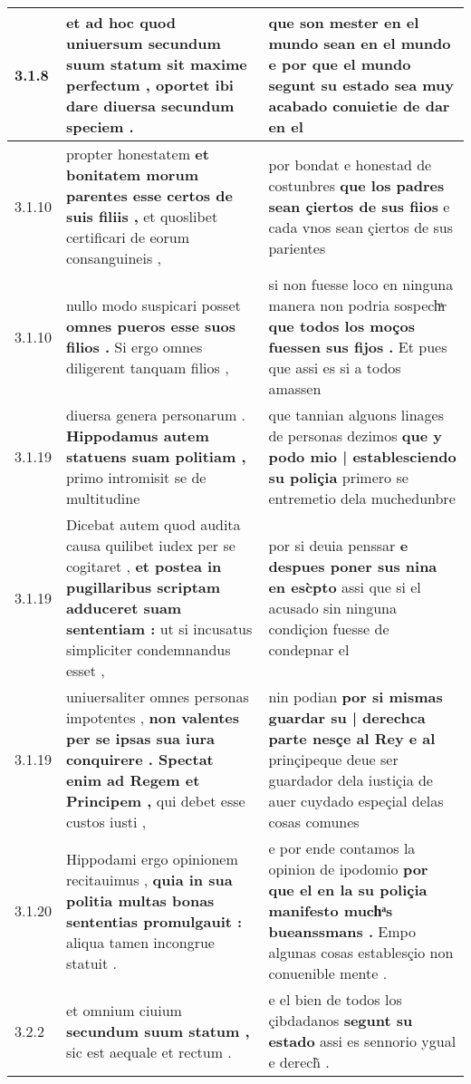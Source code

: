 \begin{tabular}{|p{1cm}|p{6.5cm}|p{6.5cm}|}
3.1.8 & et ad hoc quod uniuersum \textbf{ secundum suum statum sit maxime perfectum , } oportet ibi dare diuersa secundum speciem . & que son mester en el mundo sean en el mundo \textbf{ e por que el mundo segunt su estado sea muy acabado } conuietie de dar en el \\\hline
3.1.10 & propter honestatem \textbf{ et bonitatem morum parentes esse certos de suis filiis , } et quoslibet certificari de eorum consanguineis , & por bondat e honestad de costunbres \textbf{ que los padres sean çiertos de sus fiios } e cada vnos sean çiertos de sus parientes \\\hline
3.1.10 & nullo modo suspicari posset \textbf{ omnes pueros esse suos filios . } Si ergo omnes diligerent tanquam filios , & si non fuesse loco en ninguna manera non podria sospechͣr \textbf{ que todos los moços fuessen sus fijos . } Et pues que assi es si a todos amassen \\\hline
3.1.19 & diuersa genera personarum . \textbf{ Hippodamus autem statuens suam politiam , } primo intromisit se de multitudine & que tannian alguons linages de personas dezimos \textbf{ que y podo mio | establesciendo su poliçia } primero se entremetio dela muchedunbre \\\hline
3.1.19 & Dicebat autem quod audita causa quilibet iudex per se cogitaret , \textbf{ et postea in pugillaribus scriptam adduceret suam sententiam : } ut si incusatus simpliciter condemnandus esset , & por si deuia penssar \textbf{ e despues poner sus nina en esc̀pto } assi que si el acusado sin ninguna condiçion fuesse de condepnar el \\\hline
3.1.19 & uniuersaliter omnes personas impotentes , \textbf{ non valentes per se ipsas sua iura conquirere . Spectat enim ad Regem et Principem , } qui debet esse custos iusti , & nin podian \textbf{ por si mismas guardar su | derechca parte nesçe al Rey e al } prinçipeque deue ser guardador dela iustiçia de auer cuydado espeçial delas cosas comunes \\\hline
3.1.20 & Hippodami ergo opinionem recitauimus , \textbf{ quia in sua politia multas bonas sententias promulgauit : } aliqua tamen incongrue statuit . & e por ende contamos la opinion de ipodomio \textbf{ por que el en la su poliçia manifesto muchͣs bueanssmans . } Empo algunas cosas establesçio non conuenible mente . \\\hline
3.2.2 & et omnium ciuium \textbf{ secundum suum statum , } sic est aequale et rectum . & e el bien de todos los çibdadanos \textbf{ segunt su estado } assi es sennorio ygual e derech̃ . \\\hline

\end{tabular}
